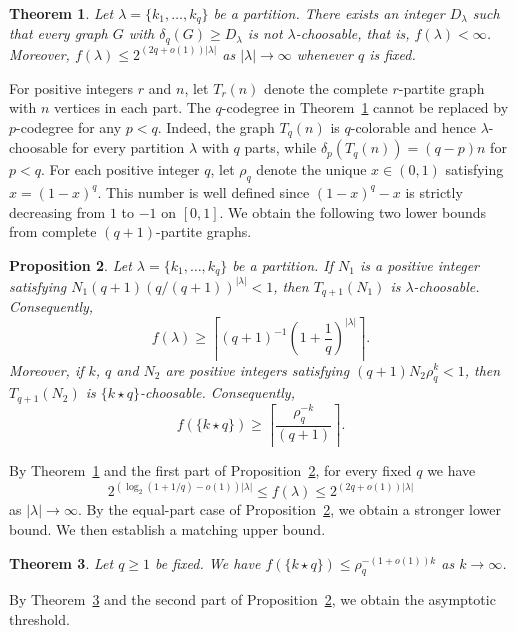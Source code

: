 \documentclass[12pt]{article}
\numberwithin{equation}{section}
\newtheorem{theorem}{Theorem}[section]
\newtheorem{proposition}[theorem]{Proposition}
\theoremstyle{definition}
\newcommand{\equalparts}[2]{\{#1\star #2\}}
\begin{document}
\begin{theorem}\label{thm:existence}
Let $\lambda=\{k_1,\ldots,k_q\}$ be a partition. There exists an integer
$D_\lambda$ such that every graph $G$ with $\delta_q(G)\geq D_\lambda$
is not $\lambda$-choosable, that is, $f(\lambda)<\infty$. Moreover,
$f(\lambda)\leq 2^{(2q+o(1))|\lambda|}$  as $|\lambda|\to\infty$
whenever $q$ is fixed.
\end{theorem}

For positive integers $r$ and $n$, let $T_r(n)$ denote the complete
$r$-partite graph with $n$ vertices in each part. The $q$-codegree in
Theorem~\ref{thm:existence} cannot be replaced by $p$-codegree for any $p < q$.
Indeed, the graph $T_q(n)$ is
$q$-colorable and hence $\lambda$-choosable for every partition $\lambda$ with
$q$ parts, while $\delta_p(T_q(n)) = (q - p)n$ for $p < q$.
For each positive integer $q$, let $\rho_q$ denote the unique $x\in(0,1)$
satisfying $x=(1-x)^q$. This number is well defined since
$(1-x)^q-x$ is strictly decreasing from $1$ to $-1$ on $[0,1]$.
We obtain the following two lower bounds from complete $(q+1)$-partite graphs.

\begin{proposition}\label{prop:lower-threshold}
Let $\lambda=\{k_1,\ldots,k_q\}$ be a partition. If $N_1$ is a positive integer satisfying
$N_1(q+1)(q/(q+1))^{|\lambda|}<1$,
then $T_{q+1}(N_1)$ is $\lambda$-choosable. Consequently,
\[
f(\lambda)\geq\left\lceil(q+1)^{-1}(1+\frac{1}{q})^{|\lambda|}\right\rceil.
\]
Moreover, if $k$, $q$ and $N_2$ are positive integers satisfying
$(q+1)N_2\rho_q^k<1$,
then $T_{q+1}(N_2)$ is $\equalparts{k}{q}$-choosable. Consequently,
\[
f(\equalparts{k}{q})\geq\left\lceil \frac{\rho_q^{-k}}{(q+1)}\right\rceil.
\]
\end{proposition}

By Theorem~\ref{thm:existence} and the first part of
Proposition~\ref{prop:lower-threshold}, for every fixed $q$ we have
\[
 2^{(\log_2(1+1/q)-o(1))|\lambda|}
 \leq f(\lambda)
 \leq 2^{(2q+o(1))|\lambda|}
\]
as
$|\lambda|\to\infty$. By the equal-part case of
Proposition~\ref{prop:lower-threshold}, we obtain a stronger lower bound. We
then establish a matching upper bound.

\begin{theorem}\label{thm:equal-upper}
Let $q\geq 1$ be fixed. We have
$f(\equalparts{k}{q}) \leq\rho_q^{-(1+o(1))k}$ as $k\to\infty$.
\end{theorem}

By Theorem~\ref{thm:equal-upper} and the second part of
Proposition~\ref{prop:lower-threshold}, we obtain the asymptotic threshold.
\end{document}
